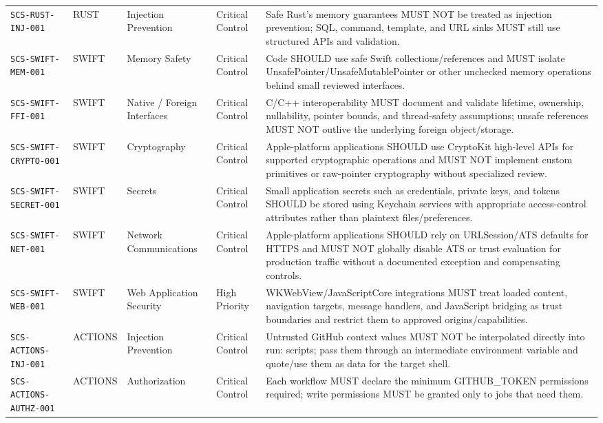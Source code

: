 \documentclass[10pt,letterpaper]{article}
\newcommand{\code}[1]{\begingroup\small\ttfamily\def\UrlFont{\ttfamily}\nolinkurl{#1}\endgroup}
\begin{document}
\begin{landscape}
\begin{longtable}{@{}P{1.3in}P{0.8in}P{1.45in}P{1.0in}P{4.65in}@{}}
\code{SCS-RUST-INJ-001} & RUST & Injection Prevention & Critical Control & Safe Rust's memory guarantees MUST NOT be treated as injection prevention; SQL, command, template, and URL sinks MUST still use structured APIs and validation.\\
\code{SCS-SWIFT-MEM-001} & SWIFT & Memory Safety & Critical Control & Code SHOULD use safe Swift collections/references and MUST isolate UnsafePointer/UnsafeMutablePointer or other unchecked memory operations behind small reviewed interfaces.\\
\code{SCS-SWIFT-FFI-001} & SWIFT & Native / Foreign Interfaces & Critical Control & C/C++ interoperability MUST document and validate lifetime, ownership, nullability, pointer bounds, and thread-safety assumptions; unsafe references MUST NOT outlive the underlying foreign object/storage.\\
\code{SCS-SWIFT-CRYPTO-001} & SWIFT & Cryptography & Critical Control & Apple-platform applications SHOULD use CryptoKit high-level APIs for supported cryptographic operations and MUST NOT implement custom primitives or raw-pointer cryptography without specialized review.\\
\code{SCS-SWIFT-SECRET-001} & SWIFT & Secrets & Critical Control & Small application secrets such as credentials, private keys, and tokens SHOULD be stored using Keychain services with appropriate access-control attributes rather than plaintext files/preferences.\\
\code{SCS-SWIFT-NET-001} & SWIFT & Network Communications & Critical Control & Apple-platform applications SHOULD rely on URLSession/ATS defaults for HTTPS and MUST NOT globally disable ATS or trust evaluation for production traffic without a documented exception and compensating controls.\\
\code{SCS-SWIFT-WEB-001} & SWIFT & Web Application Security & High Priority & WKWebView/JavaScriptCore integrations MUST treat loaded content, navigation targets, message handlers, and JavaScript bridging as trust boundaries and restrict them to approved origins/capabilities.\\
\code{SCS-ACTIONS-INJ-001} & ACTIONS & Injection Prevention & Critical Control & Untrusted GitHub context values MUST NOT be interpolated directly into run: scripts; pass them through an intermediate environment variable and quote/use them as data for the target shell.\\
\code{SCS-ACTIONS-AUTHZ-001} & ACTIONS & Authorization & Critical Control & Each workflow MUST declare the minimum GITHUB\_TOKEN permissions required; write permissions MUST be granted only to jobs that need them.\\

\end{longtable}
\end{landscape}
\end{document}
